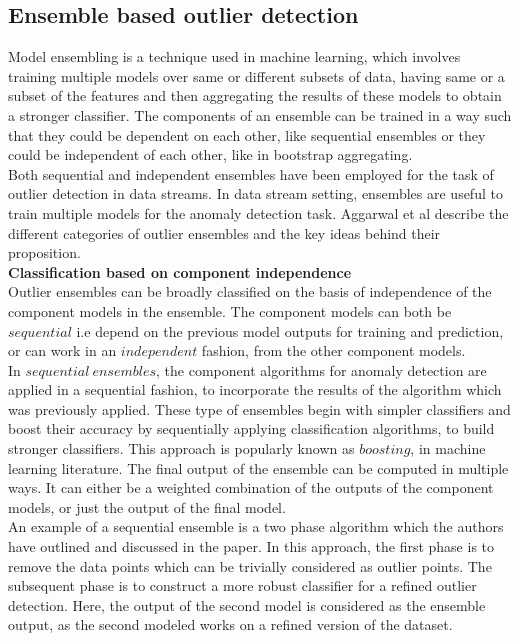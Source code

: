 \subsection{Ensemble based outlier detection}

Model ensembling is a technique used in machine learning, which involves training multiple models over same or different subsets of data, having same or a subset of the features and then aggregating the results of these models to obtain a stronger classifier. The components of an ensemble can be trained in a way such that they could be dependent on each other, like sequential ensembles\cite{RayanaZA16} or they could be independent of each other, like in bootstrap aggregating. \\

Both sequential and independent ensembles\cite{RayanaZA16}\cite{aggarwal2013outlier} have been employed for the task of outlier detection in data streams. In data stream setting, ensembles are useful to train multiple models for the anomaly detection task. Aggarwal et al describe the different categories of outlier ensembles and the key ideas behind their proposition\cite{aggarwal2013outlier}. \\

\noindent \textbf{Classification based on component independence} \\

Outlier ensembles can be broadly classified on the basis of independence of the component models in the ensemble. The component models can both be $sequential$ i.e depend on the previous model outputs for training and prediction, or can work in an $independent$ fashion, from the other component models. \\

In $sequential\ ensembles$, the component algorithms for anomaly detection are applied in a sequential fashion, to incorporate the results of the algorithm which was previously applied. These type of ensembles begin with simpler classifiers and boost their accuracy by sequentially applying classification algorithms, to build stronger classifiers. This approach is popularly known as $boosting$, in machine learning literature. The final output of the ensemble can be computed in multiple ways. It can either be a weighted combination of the outputs of the component models, or just the output of the final model. \\

An example of a sequential ensemble is a two phase algorithm which the authors have outlined and discussed in the paper. In this approach, the first phase is to remove the data points which can be trivially considered as outlier points. The subsequent phase is to construct a more robust classifier for a refined outlier detection. Here, the output of the second model is considered as the ensemble output, as the second modeled works on a refined version of the dataset. \\

